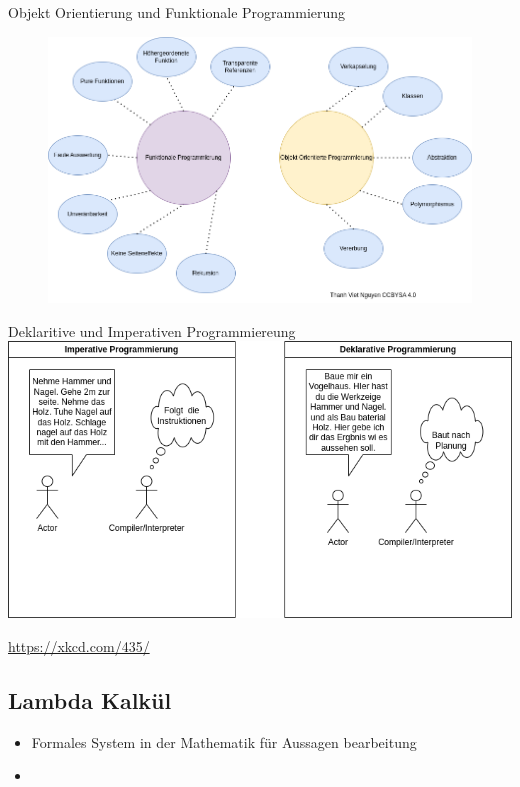 \documentclass{beamer}
\begin{document}
\begin{frame}{Objekt Orientierung und Funktionale Programmierung}
\begin{figure}
    \centering
    \includegraphics[scale=0.38]{bilder/Unterschiede.drawio.png}
\end{figure}
    
\end{frame}

\begin{frame}{Deklaritive und Imperativen Programmiereung}
\centering
\includegraphics[scale=0.38]{bilder/ProgrammierParadigmen.drawio.png}	
	
\end{frame}

\begin{frame}

    \url{https://xkcd.com/435/}
\end{frame}

\subsection{Lambda Kalkül}
\begin{frame}
	\begin{itemize}
	    \item Formales System in der Mathematik für Aussagen bearbeitung
            \item 
	\end{itemize}
\end{frame}
\end{document}

